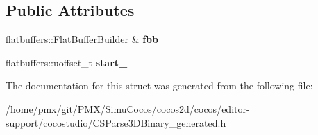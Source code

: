 \subsection*{Public Attributes}
\begin{DoxyCompactItemize}
\item 
\mbox{\label{structflatbuffers_1_1Node3DOptionBuilder_a780aa1ff8a9967e8e76f616ab7406aae}} 
\hyperlink{classflatbuffers_1_1FlatBufferBuilder}{flatbuffers\+::\+Flat\+Buffer\+Builder} \& {\bfseries fbb\+\_\+}
\item 
\mbox{\label{structflatbuffers_1_1Node3DOptionBuilder_a1fe4ae7a7aab2ba0589582c12fbf1e64}} 
flatbuffers\+::uoffset\+\_\+t {\bfseries start\+\_\+}
\end{DoxyCompactItemize}


The documentation for this struct was generated from the following file\+:\begin{DoxyCompactItemize}
\item 
/home/pmx/git/\+P\+M\+X/\+Simu\+Cocos/cocos2d/cocos/editor-\/support/cocostudio/C\+S\+Parse3\+D\+Binary\+\_\+generated.\+h\end{DoxyCompactItemize}
